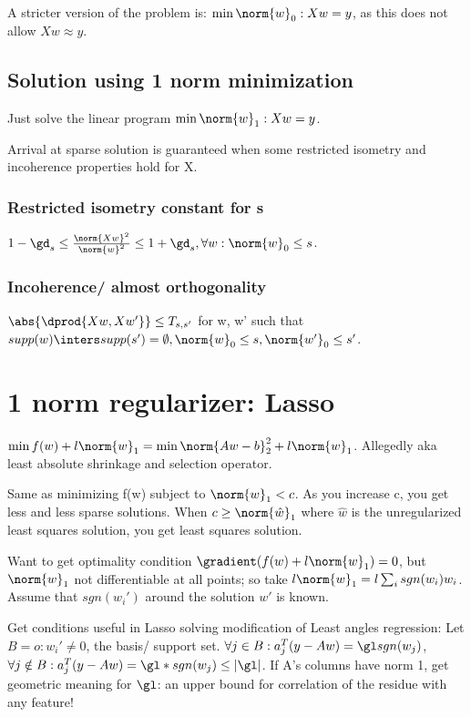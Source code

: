 \documentclass[oneside, article]{memoir}
\begin{document}
A stricter version of the problem is: $\min \norm{w}_0 : Xw = y$, as this does not allow $Xw \approx y$.

\subsection{Solution using 1 norm minimization}
Just solve the linear program $\min \norm{w}_1 : Xw = y$.

Arrival at sparse solution is guaranteed when some restricted isometry and incoherence properties hold for X. 

\subsubsection{Restricted isometry constant for s}
$1-\gd_{s} \leq \frac{\norm{Xw}^{2}}{\norm{w}^{2}} \leq 1+\gd_s, \forall w: \norm{w}_0 \leq s$.

\subsubsection{Incoherence/ almost orthogonality}
$\abs{\dprod{Xw, Xw'}} \leq T_{s, s'}$ for w, w' such that $supp(w) \inters supp(s') = \emptyset, \norm{w}_0 \leq s, \norm{w'}_0 \leq s'$.

\section{1 norm regularizer: Lasso}
$\min f(w) + l \norm{w}_{1} = \min \norm{Aw-b}_{2}^{2} + l \norm{w}_{1}$. Allegedly aka least absolute shrinkage and selection operator.

Same as minimizing f(w) subject to $\norm{w}_{1} < c$. As you increase c, you get less and less sparse solutions. When $c\geq \norm{\hat{w}}_{1}$ where $\hat{w}$ is the unregularized least squares solution, you get least squares solution.

Want to get optimality condition $\gradient (f(w) + l \norm{w}_{1}) = 0$, but $\norm{w}_1$ not differentiable at all points; so take $l \norm{w}_{1} = l \sum_i sgn(w_i) w_i$. Assume that $sgn(w_i')$ around the solution $w'$ is known.

Get conditions useful in Lasso solving modification of Least angles regression: Let $B = {o: w_i' \neq 0}$, the basis/ support set. $\forall j\in B: a_{j}^{T}(y-Aw) = \gl sgn(w_j)$, $\forall j\notin B: a_{j}^{T}(y-Aw) = \gl *sgn(w_j) \leq |\gl|$. If A's columns have norm 1, get geometric meaning for $\gl$: an upper bound for correlation of the residue with any feature!
\end{document}
